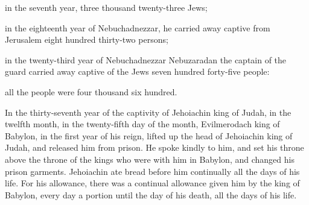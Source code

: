 {\par }{\MM in the seventh year, three thousand twenty-three Jews;
\par }{\MM {}in the eighteenth year of Nebuchadnezzar, he carried away captive from Jerusalem eight hundred thirty-two persons;
\par }{\MM {}in the twenty-third year of Nebuchadnezzar Nebuzaradan the captain of the guard carried away captive of the Jews seven hundred forty-five people:
\par }{\MM all the people were four thousand six hundred.
\par }{\PP {}In the thirty-seventh year of the captivity of Jehoiachin king of Judah, in the twelfth month, in the twenty-fifth day of the month, Evilmerodach king of Babylon, in the first year of his reign, lifted up the head of Jehoiachin king of Judah, and released him from prison.
He spoke kindly to him, and set his throne above the throne of the kings who were with him in Babylon,
and changed his prison garments. Jehoiachin ate bread before him continually all the days of his life.
For his allowance, there was a continual allowance given him by the king of Babylon, every day a portion until the day of his death, all the days of his life.
\par }